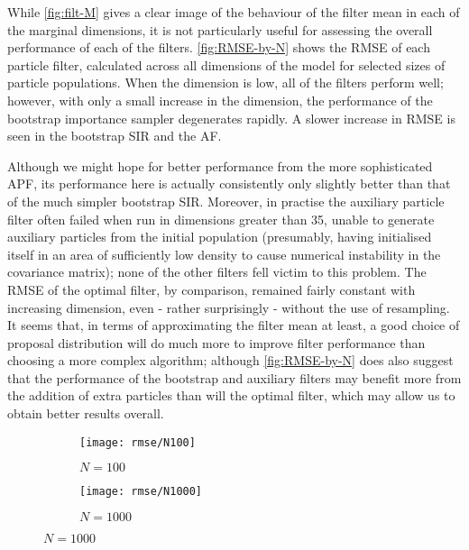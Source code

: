\documentclass[10pt,fleqn]{article}
\begin{document}
While \autoref{fig:filt-M} gives a clear image of the behaviour of the filter mean in each of the marginal dimensions, it is not particularly useful for assessing the overall performance of each of the filters. \autoref{fig:RMSE-by-N} shows the RMSE of each particle filter, calculated across all dimensions of the model for selected sizes of particle populations. When the dimension is low, all of the filters perform well; however, with only a small increase in the dimension, the performance of the bootstrap importance sampler degenerates rapidly. A slower increase in RMSE is seen in the bootstrap SIR and the AF.

Although we might hope for better performance from the more sophisticated APF, its performance here is actually consistently only slightly better than that of the much simpler bootstrap SIR. Moreover, in practise the auxiliary particle filter often failed when run in dimensions greater than 35, unable to generate auxiliary particles from the initial population (presumably, having initialised itself in an area of sufficiently low density to cause numerical instability in the covariance matrix); none of the other filters fell victim to this problem. The RMSE of the optimal filter, by comparison, remained fairly constant with increasing dimension, even - rather surprisingly - without the use of resampling. It seems that, in terms of approximating the filter mean at least, a good choice of proposal distribution will do much more to improve filter performance than choosing a more complex algorithm; although \autoref{fig:RMSE-by-N} does also suggest that the performance of the bootstrap and auxiliary filters may benefit more from the addition of extra particles than will the optimal filter, which may allow us to obtain better results overall.

\begin{figure}[H]		%
\caption{Filter accuracy: RMSE against Kalman Filter for a fixed number of particles, with changing dimensions}
\label{fig:RMSE-by-N}

	\begin{subfigure}[t]{0.49\textwidth}
		\caption{$N = 100$}
		\texttt{[image: rmse/N100]}
	\end{subfigure}
	\begin{subfigure}[t]{0.32\textwidth}
		\caption{$N = 1000$}
		\texttt{[image: rmse/N1000]}
	\end{subfigure}

\end{figure}
\end{document}
